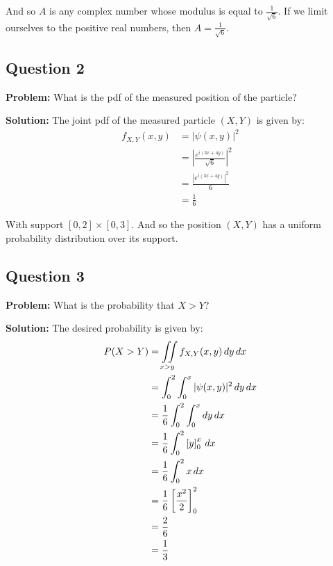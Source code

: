\documentclass{article}
\newcommand*\eval[3]{\left[#1\right]_{#2}^{#3}}
\begin{document}
And so $A$ is any complex number whose modulus is equal to $\frac{1}{\sqrt{6}}$. If we limit ourselves to the positive real numbers, then $A=\frac{1}{\sqrt{6}}$.
\bigskip

\subsection*{Question 2}
\noindent\textbf{Problem:} What is the pdf of the measured position of the particle?
\bigskip

\noindent\textbf{Solution:} The joint pdf of the measured particle $(X,Y)$ is given by:
\begin{align*}
    f_{X,Y}(x,y)&=|\psi(x,y)|^2\\
    &=\left|\frac{e^{i(3x+4y)}}{\sqrt 6}\right|^2\\
    &=\frac{\left|e^{i(3x+4y)}\right|^2}{6}\\
    &=\frac{1}{6}
\end{align*}

With support $[0,2]\times[0,3]$. And so the position $(X,Y)$ has a uniform probability distribution over its support.
\bigskip

\subsection*{Question 3}
\noindent\textbf{Problem:} What is the probability that $X>Y$?
\bigskip

\noindent\textbf{Solution:} The desired probability is given by:
\begin{align*}
    P(X>Y)&=\iint\displaylimits_{x>y}f_{X,Y}(x,y)\,dy\,dx\\
    &=\int_0^2\int_0^x|\psi(x,y)|^2\,dy\,dx\\
    &=\frac{1}{6}\int_0^2\int_0^xdy\,dx\\
    &=\frac{1}{6}\int_0^2\eval{y}{0}{x}\,dx\\
    &=\frac{1}{6}\int_0^2x\,dx\\
    &=\frac{1}{6}\eval{\frac{x^2}{2}}{0}{2}\\
    &=\frac{2}{6}\\
    &=\frac{1}{3}
\end{align*}
\bigskip
\end{document}
